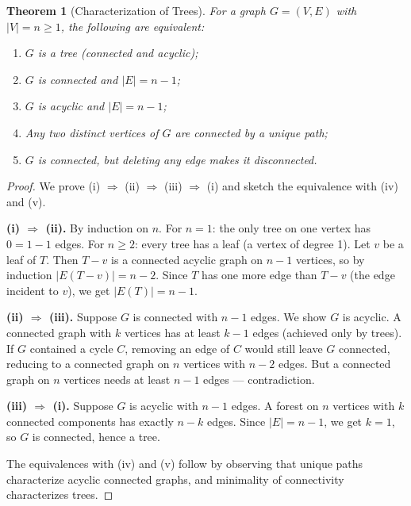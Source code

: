 \documentclass[12pt,a4paper]{amsart}
\newtheorem{theorem}{Theorem}[section]
\theoremstyle{definition}
\theoremstyle{remark}
\begin{document}
\begin{theorem}[Characterization of Trees]
\label{thm:tree-char}
For a graph $G = (V, E)$ with $|V| = n \ge 1$, the following are equivalent:
\begin{enumerate}[label=\upshape(\roman*)]
  \item $G$ is a tree (connected and acyclic);
  \item $G$ is connected and $|E| = n - 1$;
  \item $G$ is acyclic and $|E| = n - 1$;
  \item Any two distinct vertices of $G$ are connected by a unique path;
  \item $G$ is connected, but deleting any edge makes it disconnected.
\end{enumerate}
\end{theorem}

\begin{proof}
We prove (i) $\Rightarrow$ (ii) $\Rightarrow$ (iii) $\Rightarrow$ (i) and
sketch the equivalence with (iv) and (v).

\medskip
\noindent\textbf{(i) $\Rightarrow$ (ii).}
By induction on $n$. For $n = 1$: the only tree on one vertex has $0 = 1-1$
edges. For $n \ge 2$: every tree has a leaf (a vertex of degree 1). Let $v$
be a leaf of $T$. Then $T - v$ is a connected acyclic graph on $n - 1$
vertices, so by induction $|E(T-v)| = n - 2$. Since $T$ has one more edge
than $T - v$ (the edge incident to $v$), we get $|E(T)| = n - 1$.

\medskip
\noindent\textbf{(ii) $\Rightarrow$ (iii).}
Suppose $G$ is connected with $n - 1$ edges. We show $G$ is acyclic.
A connected graph with $k$ vertices has at least $k - 1$ edges (achieved only
by trees). If $G$ contained a cycle $C$, removing an edge of $C$ would still
leave $G$ connected, reducing to a connected graph on $n$ vertices with $n-2$
edges. But a connected graph on $n$ vertices needs at least $n-1$ edges —
contradiction.

\medskip
\noindent\textbf{(iii) $\Rightarrow$ (i).}
Suppose $G$ is acyclic with $n - 1$ edges. A forest on $n$ vertices with $k$
connected components has exactly $n - k$ edges. Since $|E| = n - 1$, we get
$k = 1$, so $G$ is connected, hence a tree.

\medskip
\noindent The equivalences with (iv) and (v) follow by observing that unique
paths characterize acyclic connected graphs, and minimality of connectivity
characterizes trees.
\end{proof}
\end{document}
